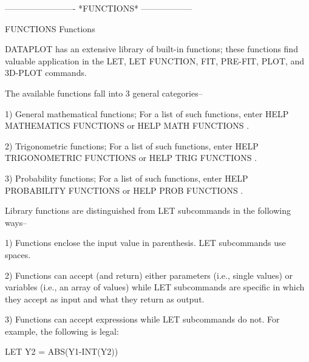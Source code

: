  
 
 
 
 
 
 
 
 
 
 
 
 
 
 
 
 
 
 
 
 
 
 
 
 
 
 
 
 
 
 
 
 
 
 
 
 
 
-------------------------  *FUNCTIONS*  ------------------
 
FUNCTIONS
Functions
 
DATAPLOT has an extensive library of built-in functions; these
functions find valuable application in the LET, LET FUNCTION, FIT,
PRE-FIT, PLOT, and 3D-PLOT commands.
 
The available functions fall into 3 general categories--
 
   1) General mathematical functions;
      For a list of such functions, enter HELP MATHEMATICS FUNCTIONS
      or HELP MATH FUNCTIONS   .
 
   2) Trigonometric functions;
      For a list of such functions, enter HELP TRIGONOMETRIC FUNCTIONS
      or HELP TRIG FUNCTIONS   .
 
   3) Probability functions;
      For a list of such functions, enter HELP PROBABILITY FUNCTIONS
      or HELP PROB FUNCTIONS   .
 
Library functions are distinguished from LET subcommands in the
following ways--
 
   1) Functions enclose the input value in parenthesis.  LET
      subcommands use spaces.
 
   2) Functions can accept (and return) either parameters (i.e., single
      values) or variables (i.e., an array of values) while LET
      subcommands are specific in which they accept as input and what
      they return as output.
 
   3) Functions can accept expressions while LET subcommands do not.
      For example, the following is legal:
 
         LET Y2 = ABS(Y1-INT(Y2))
 
